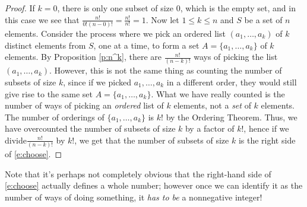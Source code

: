\documentclass[11pt,dvipsnames]{book}
\numberwithin{equation}{section} %
\numberwithin{figure}{section} %
\numberwithin{table}{section} %
\begin{document}
\begin{proof}
If $k=0$, there is only one subset of size $0$, which is the empty set, and in this case we see that $\frac{n!}{0!(n-0)!}=\frac{n!}{n!}=1$. Now let $1\leq k\leq n$ and $S$ be a set of $n$ elements. Consider the process where we pick an ordered list $(a_{1}, \dots ,a_{k})$ of $k$ distinct elements from $S$, one at a time, to form a set $A=\{a_{1}, \dots ,a_{k}\}$ of $k$ elements. By Proposition \ref{p:n^k}, there are $\frac{n!}{(n-k)!}$ ways of picking the list $(a_{1}, \dots ,a_{k})$. However, this is not the same thing as counting the number of subsets of size $k$, since if we picked $a_1, \dots ,a_k$ in a different order, they would still give rise to the same set $A=\{a_{1}, \dots ,a_{k}\}$. What we have really counted is the number of ways of picking an {\it ordered} list of $k$ elements, not a {\it set} of $k$ elements. The number of orderings of $\{a_{1}, \dots ,a_{k}\}$  is $k!$ by the Ordering Theorem. Thus, we have overcounted the number of subsets of size $k$ by a factor of $k!$, hence if we divide$\frac{n!}{(n-k)!}$ by $k!$, we get that the number of subsets of size $k$ is the right side of \eqref{e:choose}.
\end{proof}
Note that it's perhaps not completely obvious that the right-hand side of \eqref{e:choose} actually defines a whole number; however once we can identify it as the number of ways of doing something, it {\em has to be} a nonnegative integer!
%
%
\end{document}
